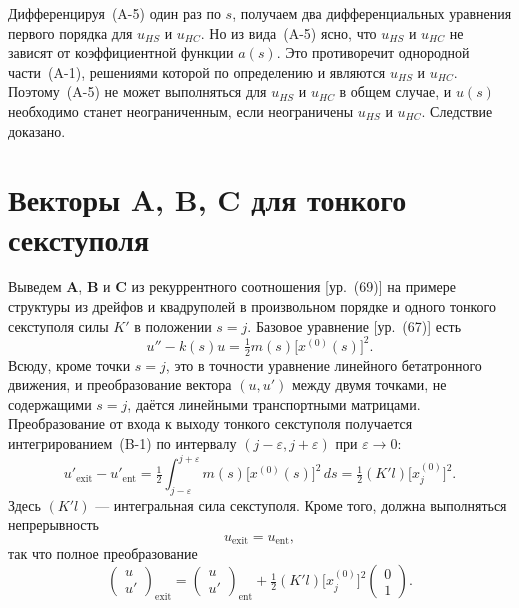 \documentclass[11pt,a4paper]{article}
\begin{document}
Дифференцируя~(A-5) один раз по $s$, получаем два дифференциальных уравнения
первого порядка для $u_{HS}$ и $u_{HC}$. Но из вида~(A-5) ясно, что $u_{HS}$ и
$u_{HC}$ не зависят от коэффициентной функции $a(s)$. Это противоречит однородной
части~(A-1), решениями которой по определению и являются $u_{HS}$ и $u_{HC}$.
Поэтому~(A-5) не может выполняться для $u_{HS}$ и $u_{HC}$ в общем случае, и
$u(s)$ необходимо станет неограниченным, если неограничены $u_{HS}$ и $u_{HC}$.
Следствие доказано.

\section{Векторы A, B, C для тонкого секступоля}

Выведем $\mathbf{A}$, $\mathbf{B}$ и $\mathbf{C}$ из рекуррентного соотношения
[ур.~(69)] на примере структуры из дрейфов и квадруполей в произвольном порядке
и одного тонкого секступоля силы $K'$ в положении $s=j$. Базовое уравнение
[ур.~(67)] есть
\begin{equation}
u''-k(s)u=\tfrac12 m(s)\bigl[x^{(0)}(s)\bigr]^2.
\end{equation}
Всюду, кроме точки $s=j$, это в точности уравнение линейного бетатронного
движения, и преобразование вектора $(u,u')$ между двумя точками, не содержащими
$s=j$, даётся линейными транспортными матрицами. Преобразование от входа к выходу
тонкого секступоля получается интегрированием~(B-1) по интервалу
$(j-\varepsilon,j+\varepsilon)$ при $\varepsilon\to 0$:
\begin{equation}
u'_{\mathrm{exit}}-u'_{\mathrm{ent}}
=\tfrac12\int_{j-\varepsilon}^{j+\varepsilon}m(s)\bigl[x^{(0)}(s)\bigr]^2\,ds
=\tfrac12(K'l)\bigl[x_j^{(0)}\bigr]^2.
\end{equation}
Здесь $(K'l)$ --- интегральная сила секступоля. Кроме того, должна выполняться
непрерывность
\begin{equation}
u_{\mathrm{exit}}=u_{\mathrm{ent}},
\end{equation}
так что полное преобразование
\begin{equation}
\begin{pmatrix}u\\ u'\end{pmatrix}_{\mathrm{exit}}
=
\begin{pmatrix}u\\ u'\end{pmatrix}_{\mathrm{ent}}
+\tfrac12(K'l)\bigl[x_j^{(0)}\bigr]^2
\begin{pmatrix}0\\ 1\end{pmatrix}.
\end{equation}
\end{document}
